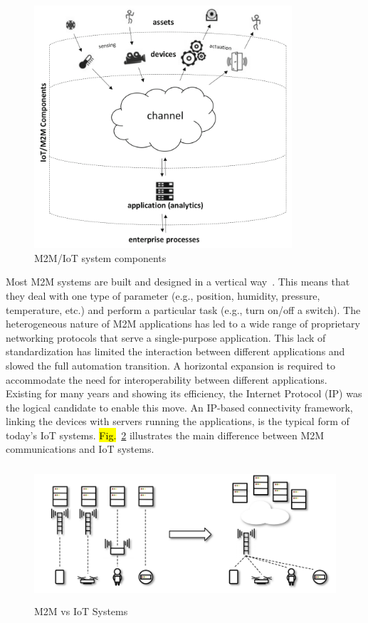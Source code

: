 \documentclass[]{IEEEtran}
\begin{document}
\begin{figure}
\centerline{\includegraphics[width=\linewidth,height=9cm]{Pictures/IoT Components.png}}
\caption{M2M/IoT system components~\cite{herrero_fundamentals_2021}}
\label{fig:IoT_components}
\end{figure}

Most M2M systems are built and designed in a vertical way~\cite{alam2013evolution}.
This means that they deal with one type of parameter (e.g., position, humidity, pressure, temperature, etc.) and perform a particular task (e.g., turn on/off a switch).
The heterogeneous nature of M2M applications has led to a wide range of proprietary networking protocols that serve a single-purpose application.
This lack of standardization has limited the interaction between different applications and slowed the full automation transition.
A horizontal expansion is required to accommodate the need for interoperability between different applications.
Existing for many years and showing its efficiency, the Internet Protocol (IP) was the logical candidate to enable this move.
An IP-based connectivity framework, linking the devices with servers running the applications, is the typical form of today's IoT systems.
\hl{Fig.}~\ref{fig:M2M_vs_IoT} illustrates the main difference between M2M communications and IoT systems.
\begin{figure}
\centerline{\includegraphics[width=\linewidth,height=5cm]{Pictures/M2M to IoT.png}}
\caption{M2M vs IoT Systems
~\cite{liberg_cellular_2019}}
\label{fig:M2M_vs_IoT}
\end{figure}
\end{document}
